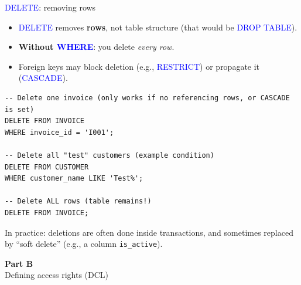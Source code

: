 \documentclass[10pt,aspectratio=169]{beamer}
\newcommand{\sqlk}[1]{\textcolor{blue}{#1}}
\newcommand{\partslide}[2]{%
  \begin{frame}[plain]
    \vfill
    {\Huge\textbf{#1}}\\[0.6em]
    {\Large #2}
    \vfill
  \end{frame}
}
\begin{document}
\begin{frame}[fragile]{\sqlk{DELETE}: removing rows}
\small
\begin{itemize}
  \item \sqlk{DELETE} removes \textbf{rows}, not table structure (that would be \sqlk{DROP TABLE}).
  \item \textbf{Without \sqlk{WHERE}}: you delete \emph{every row}.
  \item Foreign keys may block deletion (e.g., \sqlk{RESTRICT}) or propagate it (\sqlk{CASCADE}).
\end{itemize}
\vspace{1mm}

\begin{lstlisting}[style=sqlite,basicstyle=\scriptsize\ttfamily]
-- Delete one invoice (only works if no referencing rows, or CASCADE is set)
DELETE FROM INVOICE
WHERE invoice_id = 'I001';

-- Delete all "test" customers (example condition)
DELETE FROM CUSTOMER
WHERE customer_name LIKE 'Test%';

-- Delete ALL rows (table remains!)
DELETE FROM INVOICE;
\end{lstlisting}

\vspace{0.5em}
\footnotesize In practice: deletions are often done inside transactions, and sometimes replaced by “soft delete”
(e.g., a column \texttt{is\_active}).
\end{frame}


\partslide{Part B}{Defining access rights (DCL)}
\end{document}
